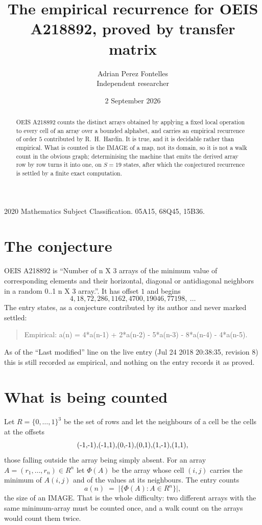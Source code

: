 \documentclass[11pt,a4paper]{article}
\title{The empirical recurrence for OEIS A218892, proved by transfer matrix}
\author{Adrian Perez Fontelles\\ \small Independent researcher}
\date{2 September 2026}
\theoremstyle{plain}
\theoremstyle{definition}
\begin{document}
\maketitle

\begin{abstract}
OEIS A218892 counts the distinct arrays obtained by applying a fixed local operation to every cell
of an array over a bounded alphabet, and carries an empirical recurrence of order $5$
contributed by R.~H.~Hardin. It is true, and it is decidable rather than empirical. What is
counted is the IMAGE of a map, not its domain, so it is not a walk count in the obvious graph;
determinising the machine that emits the derived array row by row turns it into one, on
$S=19$ states, after which the conjectured recurrence is settled by a finite exact
computation.
\end{abstract}

\noindent\small 2020 Mathematics Subject Classification. 05A15, 68Q45, 15B36.\normalsize

\section{The conjecture}

OEIS A218892 is ``Number of n X 3 arrays of the minimum value of corresponding elements and their horizontal, diagonal or antidiagonal neighbors in a random 0..1 n X 3 array.''. It has offset $1$ and begins
\[
4, 18, 72, 286, 1162, 4700, 19046, 77198,\ \dots
\]
The entry states, as a conjecture contributed by its author and never marked settled:
\begin{quote}
Empirical: a(n) = 4*a(n-1) + 2*a(n-2) - 5*a(n-3) - 8*a(n-4) - 4*a(n-5).
\end{quote}
As of the ``Last modified'' line on the live entry (Jul 24 2018 20:38:35, revision 8) this is still
recorded as empirical, and nothing on the entry records it as proved.

\section{What is being counted}

Let $R=\{0,\dots,1\}^{3}$ be the set of rows and let the neighbours of
a cell be the cells at the offsets
\[
$(-1,-1)$, $(-1,1)$, $(0,-1)$, $(0,1)$, $(1,-1)$, $(1,1)$,
\]
those falling outside the array being simply absent. For an array
$A=(r_1,\dots,r_n)\in R^n$ let $\Phi(A)$ be the array whose cell $(i,j)$ carries the
minimum of $A(i,j)$ and of the values at its neighbours. The entry counts
\[
a(n)\;=\;\bigl|\{\Phi(A):A\in R^n\}\bigr| ,
\]
the size of an IMAGE. That is the whole difficulty: two different arrays with the same
minimum-array must be counted once, and a walk count on the arrays would count them twice.
\end{document}
